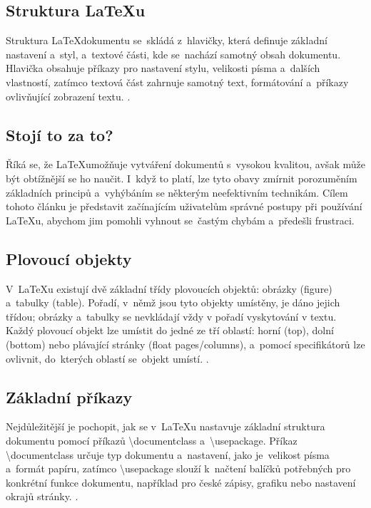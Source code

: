 \documentclass[a4paper, 11pt]{article}
\begin{document}
\subsection{Struktura \LaTeX{}u}
Struktura \LaTeX dokumentu se~skládá z~hlavičky, která definuje základní nastavení a~styl, a~textové části, kde se~nachází samotný obsah dokumentu. 
Hlavička obsahuje příkazy pro nastavení stylu, velikosti písma a~dalších vlastností, zatímco textová část zahrnuje samotný text, formátování a~příkazy ovlivňující zobrazení textu.
\cite{Benes1998}.

\subsection{Stojí to za to?}
Říká se, že \LaTeX umožňuje vytváření dokumentů s~vysokou kvalitou, avšak může být obtížnější se ho naučit. I~když to platí, lze tyto obavy zmírnit porozuměním základních principů a~vyhýbáním se některým neefektivním technikám. 
Cílem tohoto článku \cite{Beeton2023} je představit začínajícím uživatelům správné postupy při používání \LaTeX{}u, abychom jim pomohli vyhnout se~častým chybám a~předešli frustraci.

\subsection{Plovoucí objekty}
V~\LaTeX{}u existují dvě základní třídy plovoucích objektů: obrázky (figure) a~tabulky (table). 
Pořadí, v~němž jsou tyto objekty umístěny, je dáno jejich třídou; obrázky a~tabulky se nevkládají vždy v pořadí vyskytování v textu. 
Každý plovoucí objekt lze umístit do jedné ze tří oblastí: horní (top), dolní (bottom) nebo plávající stránky (float pages/columns), a~pomocí specifikátorů lze ovlivnit, do~kterých oblastí se~objekt umístí.
\cite{Mittelbach2014}.

\subsection{Základní příkazy}
Nejdůležitější je pochopit, jak se v~\LaTeX{}u nastavuje základní struktura dokumentu pomocí příkazů \textbackslash documentclass a~\textbackslash usepackage. 
Příkaz \textbackslash documentclass určuje typ dokumentu a~nastavení, jako je~velikost písma a~formát papíru, zatímco \textbackslash usepackage 
slouží k~načtení balíčků potřebných pro konkrétní funkce dokumentu, například pro české zápisy, grafiku nebo nastavení okrajů stránky.
\cite{Bartik2017}.
\end{document}
